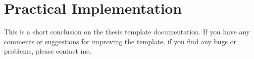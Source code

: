 \chapter{Practical Implementation}

This is a short conclusion on the thesis template documentation. If you have any comments or suggestions for improving the template, if you find any bugs or problems, please contact me. 

